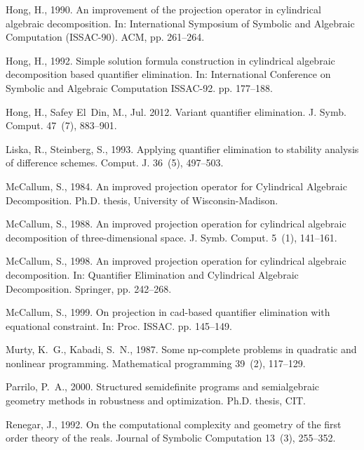 \documentclass[amsthm]{elsart}
\begin{document}
\begin{thebibliography}{32}
Hong, H., 1990. An improvement of the projection operator in cylindrical
  algebraic decomposition. In: International Symposium of Symbolic and
  Algebraic Computation (ISSAC-90). ACM, pp. 261--264.

Hong, H., 1992. Simple solution formula construction in cylindrical algebraic
  decomposition based quantifier elimination. In: International Conference on
  Symbolic and Algebraic Computation ISSAC-92. pp. 177--188.

Hong, H., Safey El~Din, M., Jul. 2012. Variant quantifier elimination. J. Symb.
  Comput. 47~(7), 883--901.

Liska, R., Steinberg, S., 1993. Applying quantifier elimination to stability
  analysis of difference schemes. Comput. J. 36~(5), 497--503.

{McCallum}, S., 1984. An improved projection operator for {C}ylindrical
  {A}lgebraic {D}ecomposition. Ph.D. thesis, University of Wisconsin-Madison.

McCallum, S., 1988. An improved projection operation for cylindrical algebraic
  decomposition of three-dimensional space. J. Symb. Comput. 5~(1), 141--161.

McCallum, S., 1998. An improved projection operation for cylindrical algebraic
  decomposition. In: Quantifier Elimination and Cylindrical Algebraic
  Decomposition. Springer, pp. 242--268.

McCallum, S., 1999. On projection in cad-based quantifier elimination with
  equational constraint. In: Proc. ISSAC. pp. 145--149.

Murty, K.~G., Kabadi, S.~N., 1987. Some np-complete problems in quadratic and
  nonlinear programming. Mathematical programming 39~(2), 117--129.

Parrilo, P.~A., 2000. Structured semidefinite programs and semialgebraic
  geometry methods in robustness and optimization. Ph.D. thesis, CIT.

Renegar, J., 1992. On the computational complexity and geometry of the first
  order theory of the reals. Journal of {S}ymbolic {C}omputation 13~(3),
  255--352.


\end{thebibliography}
\end{document}
